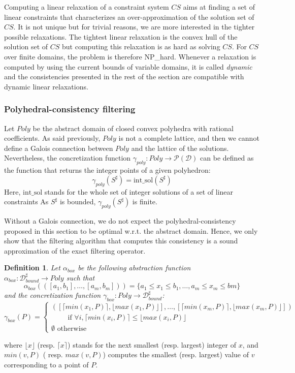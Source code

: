 \documentclass[submission,copyright,creativecommons]{eptcs}
\newtheorem{definition}{Definition}
\newcommand{\parties}[1]{\mathcal{P}(#1)}
\newcommand{\sh}[1]{\ensuremath{#1^\sharp}}
\begin{document}
Computing a linear relaxation of a constraint system $CS$ aims at finding a set of
linear constraints that characterizes an over-approximation of the solution set of
$CS$. It is not unique but for trivial reasons, we are more interested in the tighter 
possible relaxations. The tightest linear relaxation is the convex hull of the solution set
of $CS$ but computing this relaxation is as hard as solving $CS$. For $CS$ over finite domains,
the problem is therefore NP\_hard. 
Whenever a relaxation is computed by using the current bounds 
of variable domains, it is called {\it dynamic} and the consistencies presented in the rest
of the section are compatible with dynamic linear relaxations.

\subsubsection{Polyhedral-consistency filtering}

Let $Poly$ be the abstract domain of closed convex polyhedra with rational coefficients.
As said previously, $Poly$ is not a complete lattice, and then we cannot define
a Galois connection between $Poly$ and the lattice of the solutions.
Nevertheless, the concretization function  
$\gamma_{poly} : Poly \rightarrow \parties{\mathcal{D}}$ can be defined as the function that
returns the integer points of a given polyhedron:
$$ \gamma_{poly}(\sh{S}) = \textrm{int\_sol}(\sh{S}) $$
Here,  $\textrm{int\_sol}$ stands for the whole set of integer solutions of a set of linear constraints
As $\sh{S}$ is bounded, $\gamma_{poly}(\sh{S})$ is finite.

Without a Galois connection, we do not expect the polyhedral-consistency
proposed in this section to be optimal w.r.t. the abstract domain.
Hence, we only show that the filtering algorithm that computes this
consistency is a sound approximation of the exact filtering operator.

\begin{definition}
Let $\alpha_{box}$ be the following abstraction function\\
$\alpha_{box} : \sh{\mathcal{D}_{bound}} \rightarrow Poly$
such that
$$ \alpha_{box}(([a_1,b_1],\ldots,[a_m,b_m])) = \{a_1 \leq x_1 \leq b_1, \ldots, a_m \leq x_m \leq bm\} $$
and the concretization function $\gamma_{box} :  Poly \rightarrow \sh{\mathcal{D}_{bound}}$:
$$
\gamma_{box}(P) = \left\{ \begin{array}{l}([\lceil min(x_1,P) \rceil, \lfloor
  max(x_1,P) \rfloor],\ldots,[\lceil min(x_m,P) \rceil, \lfloor
  max(x_m,P) \rfloor]) \\\textrm{~~~~~~ if~}\forall i,  \lceil min(x_i,P) \rceil \leq \lfloor
  max(x_i,P) \rfloor \\
  \emptyset \textrm{ otherwise}
\end{array} \right.
$$
\end{definition}
\noindent
where $\lfloor x \rfloor$ (resp. $\lceil x \rceil$) stands for the next smallest (resp. largest) integer of $x$,
and $min(v,P)$ ( resp. $max(v,P)$) computes the smallest (resp. largest) value of $v$ corresponding to a point of $P$.
\end{document}
